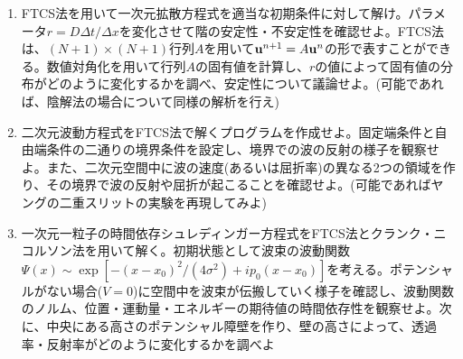\documentclass[11pt]{jarticle}
\begin{document}
\begin{enumerate}
\hspace*{-2em} {\bf [偏微分方程式]}

\item FTCS法を用いて一次元拡散方程式を適当な初期条件に対して解け。パラメータ$r=D\Delta t / \Delta x$を変化させて階の安定性・不安定性を確認せよ。FTCS法は、$(N+1) \times (N+1)$行列$A$を用いて${\bf u}^{n+1} = A {\bf u}^n$の形で表すことができる。数値対角化を用いて行列$A$の固有値を計算し、$r$の値によって固有値の分布がどのように変化するかを調べ、安定性について議論せよ。(可能であれば、陰解法の場合について同様の解析を行え)

\item 二次元波動方程式をFTCS法で解くプログラムを作成せよ。固定端条件と自由端条件の二通りの境界条件を設定し、境界での波の反射の様子を観察せよ。また、二次元空間中に波の速度(あるいは屈折率)の異なる2つの領域を作り、その境界で波の反射や屈折が起こることを確認せよ。(可能であればヤングの二重スリットの実験を再現してみよ)

\item 一次元一粒子の時間依存シュレディンガー方程式をFTCS法とクランク・ニコルソン法を用いて解く。初期状態として波束の波動関数$\Psi(x) \sim \exp [-(x-x_0)^2/(4\sigma^2) + i p_0(x-x_0)]$を考える。ポテンシャルがない場合($V=0$)に空間中を波束が伝搬していく様子を確認し、波動関数のノルム、位置・運動量・エネルギーの期待値の時間依存性を観察せよ。次に、中央にある高さのポテンシャル障壁を作り、壁の高さによって、透過率・反射率がどのように変化するかを調べよ
  




\end{enumerate}
\end{document}
